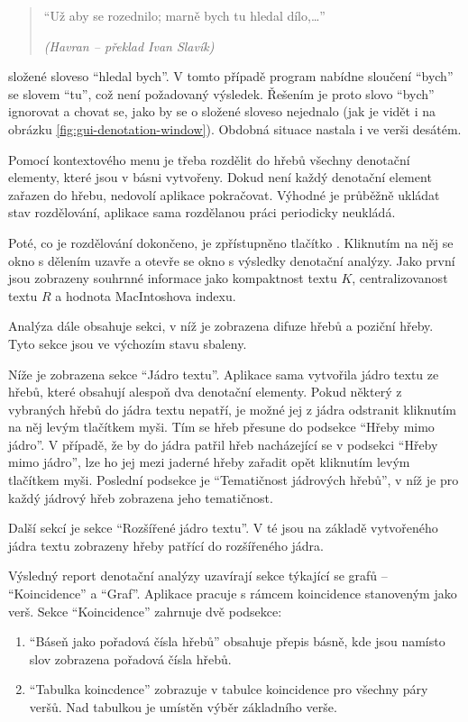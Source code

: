 \documentclass[dp.tex]{subfiles}
\begin{document}
\begin{description}[style=nextline]
		\begin{verse}
		\enquote{Už aby se rozednilo; marně bych tu hledal dílo,\ldots}
		\begin{flushright}
		\textit{(Havran -- překlad Ivan Slavík)}
		\end{flushright}
		\end{verse}

	složené sloveso \enquote{hledal bych}. V tomto případě program nabídne sloučení \enquote{bych} se slovem \enquote{tu}, což není požadovaný výsledek. Řešením je proto slovo \enquote{bych} ignorovat a chovat se, jako by se o složené sloveso nejednalo (jak je vidět i na obrázku \ref{fig:gui-denotation-window}). Obdobná situace nastala i ve verši desátém.
\end{description}

Pomocí kontextového menu je třeba rozdělit do hřebů všechny denotační elementy, které jsou v básni vytvořeny. Dokud není každý denotační element zařazen do hřebu, nedovolí aplikace pokračovat. Výhodné je průběžně ukládat stav rozdělování, aplikace sama rozdělanou práci periodicky neukládá.

Poté, co je rozdělování dokončeno, je zpřístupněno tlačítko . Kliknutím na něj se okno s dělením uzavře a otevře se okno s výsledky denotační analýzy. Jako první jsou zobrazeny souhrnné informace jako kompaktnost textu $K$, centralizovanost textu $R$ a hodnota MacIntoshova indexu.

Analýza dále obsahuje sekci, v níž je zobrazena difuze hřebů a poziční hřeby. Tyto sekce jsou ve výchozím stavu sbaleny.

Níže je zobrazena sekce \enquote{Jádro textu}. Aplikace sama vytvořila jádro textu ze hřebů, které obsahují alespoň dva denotační elementy. Pokud některý z vybraných hřebů do jádra textu nepatří, je možné jej z jádra odstranit kliknutím na něj levým tlačítkem myši. Tím se hřeb přesune do podsekce \enquote{Hřeby mimo jádro}. V případě, že by do jádra patřil hřeb nacházející se v podsekci \enquote{Hřeby mimo jádro}, lze ho jej mezi jaderné hřeby zařadit opět kliknutím levým tlačítkem myši. Poslední podsekce je \enquote{Tematičnost jádrových hřebů}, v níž je pro každý jádrový hřeb zobrazena jeho tematičnost. 

Další sekcí je sekce \enquote{Rozšířené jádro textu}. V té jsou na základě vytvořeného jádra textu zobrazeny hřeby patřící do rozšířeného jádra.

Výsledný report denotační analýzy uzavírají sekce týkající se grafů -- \enquote{Koincidence} a \enquote{Graf}. Aplikace pracuje s rámcem koincidence stanoveným jako verš. Sekce \enquote{Koincidence} zahrnuje dvě podsekce:
\begin{enumerate}
\item \enquote{Báseň jako pořadová čísla hřebů} obsahuje přepis básně, kde jsou namísto slov zobrazena pořadová čísla hřebů. 
\item \enquote{Tabulka koincdence} zobrazuje v tabulce koincidence pro všechny páry veršů. Nad tabulkou je umístěn výběr základního verše.
\end{enumerate}
\end{document}
